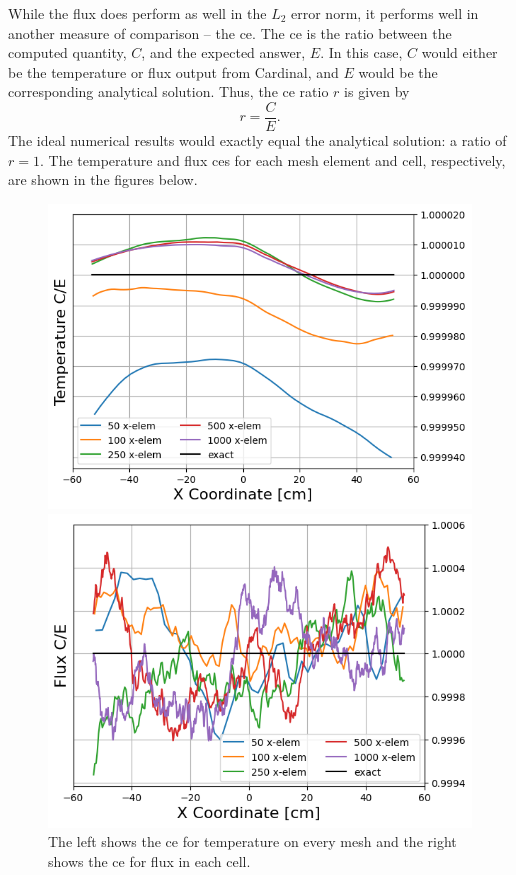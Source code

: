 \documentclass[letterpaper]{mc2023}
\begin{document}
While the flux does perform as well in the $L_{2}$ error norm, it performs well in another measure of comparison -- the \gls{ce}. The
\gls{ce} is the ratio between the computed quantity, $C$, and the expected answer, $E$. In this case, $C$ would either be the temperature or flux
output from Cardinal, and $E$ would be the corresponding analytical solution. Thus, the \gls{ce} ratio $r$ is given by
\begin{equation} \label{eq:ce}
   r  = \frac{C}{E}.
\end{equation}
The ideal numerical results would exactly equal the analytical solution: a ratio of $r=1$. The temperature and flux \glspl{ce} for each mesh element
and cell, respectively, are shown in the figures below.
\begin{figure}[H]
    \centering
    \begin{minipage}[b]{0.495\linewidth}
        \includegraphics[width=\linewidth]{figures/temp_num_to_analy_ratios.png}
    \end{minipage}
    \begin{minipage}[b]{0.495\linewidth}
        \includegraphics[width=\linewidth]{figures/flux_num_to_analy_ratios.png}
    \end{minipage}
    \caption{The left shows the \gls{ce} for temperature on every mesh and the right shows the \gls{ce} for flux in each cell.}
\end{figure}
\end{document}
